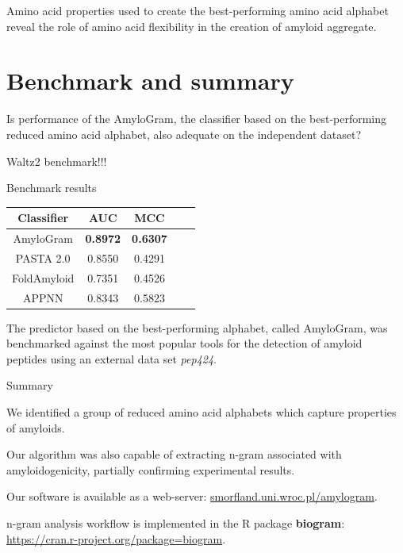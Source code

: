 \documentclass{beamer}\usepackage[]{graphicx}\usepackage[]{color}
\begin{document}
\begin{frame}
Amino acid properties used to create the best-performing amino acid alphabet reveal the role of amino acid flexibility in the creation of amyloid aggregate.
\end{frame}

\section{Benchmark and summary}

\begin{frame}
Is performance of the AmyloGram, the classifier based on the best-performing reduced amino acid alphabet, also adequate on the independent dataset?
\end{frame}

\begin{frame}
Waltz2 benchmark!!!\end{frame}

\begin{frame}{Benchmark results}

\begin{table}[ht]
\centering

\begin{tabular}{ccccc}
  \toprule
Classifier & AUC & MCC \\ 
  \midrule
AmyloGram & \textbf{0.8972} & \textbf{0.6307} \\ 
  \rowcolor{white}PASTA 2.0\citep{walsh_pasta_2014} & 0.8550 & 0.4291  \\ 
   FoldAmyloid \citep{garbuzynskiy_foldamyloid:_2010} & 0.7351 & 0.4526  \\ 
  \rowcolor{white}APPNN \citep{familia_prediction_2015} & 0.8343 & 0.5823  \\ 
   \bottomrule
\end{tabular}
\end{table}

The predictor based on the best-performing alphabet, called AmyloGram, was benchmarked against the most popular tools for the detection of amyloid peptides using an external data set \textit{pep424}.

\end{frame}

\begin{frame}{Summary}

We identified a group of reduced amino acid alphabets which capture properties of amyloids. 

Our algorithm was also capable of extracting n-gram associated with amyloidogenicity, partially confirming experimental results.

Our software is available as a web-server: \url{smorfland.uni.wroc.pl/amylogram}.

n-gram analysis workflow is implemented in the R package \textbf{biogram}: \url{https://cran.r-project.org/package=biogram}.

\end{frame}
\end{document}
